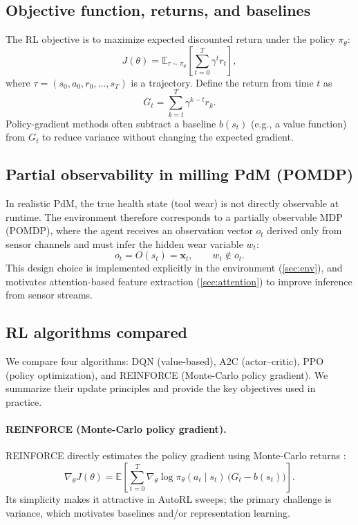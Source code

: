 \documentclass[11pt]{article}
\begin{document}
\subsection{Objective function, returns, and baselines}
\label{sec:objective}
The RL objective is to maximize expected discounted return under the policy $\pi_\theta$:
\begin{equation}
J(\theta)=\mathbb{E}_{\tau\sim\pi_\theta}\left[\sum_{t=0}^{T}\gamma^t r_t\right],
\end{equation}
where $\tau=(s_0,a_0,r_0,\ldots,s_T)$ is a trajectory.
Define the return from time $t$ as
\begin{equation}
G_t = \sum_{k=t}^{T} \gamma^{k-t} r_k.
\end{equation}
Policy-gradient methods often subtract a baseline $b(s_t)$ (e.g., a value function) from $G_t$ to reduce variance without changing the expected gradient.

\subsection{Partial observability in milling PdM (POMDP)}
\label{sec:pomdp}
In realistic PdM, the true health state (tool wear) is not directly observable at runtime. The environment therefore corresponds to a partially observable MDP (POMDP), where the agent receives an observation vector $o_t$ derived only from sensor channels and must infer the hidden wear variable $w_t$:
\begin{equation}
	o_t = O(s_t) = \mathbf{x}_t, \qquad w_t \notin o_t.
\end{equation}
This design choice is implemented explicitly in the environment (\cref{sec:env}), and motivates attention-based feature extraction (\cref{sec:attention}) to improve inference from sensor streams.

\subsection{RL algorithms compared}
\label{sec:algos}
We compare four algorithms: DQN (value-based), A2C (actor--critic), PPO (policy optimization), and REINFORCE (Monte-Carlo policy gradient). We summarize their update principles and provide the key objectives used in practice.

\paragraph{REINFORCE (Monte-Carlo policy gradient).}
REINFORCE directly estimates the policy gradient using Monte-Carlo returns \parencite{Williams1992REINFORCE}:
\begin{equation}
\nabla_\theta J(\theta) = \mathbb{E}\left[\sum_{t=0}^{T} \nabla_\theta \log \pi_\theta(a_t\mid s_t)\,\big(G_t-b(s_t)\big)\right].
\end{equation}
Its simplicity makes it attractive in AutoRL sweeps; the primary challenge is variance, which motivates baselines and/or representation learning.
\end{document}
